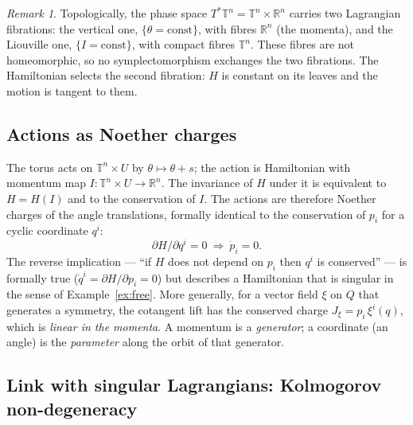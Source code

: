 \documentclass[11pt,a4paper]{article}
\theoremstyle{definition}
\theoremstyle{remark}
\newtheorem{remark}[theorem]{Remark}
\newcommand{\R}{\mathbb{R}}
\newcommand{\Tor}{\mathbb{T}}
\begin{document}
\begin{remark}
Topologically, the phase space $T^*\Tor^n=\Tor^n\times\R^n$ carries two Lagrangian fibrations: the vertical one, $\{\theta=\mathrm{const}\}$, with fibres $\R^n$ (the momenta), and the Liouville one, $\{I=\mathrm{const}\}$, with compact fibres $\Tor^n$. These fibres are not homeomorphic, so no symplectomorphism exchanges the two fibrations. The Hamiltonian selects the second fibration: $H$ is constant on its leaves and the motion is tangent to them.
\end{remark}

\subsection{Actions as Noether charges}

The torus acts on $\Tor^n\times U$ by $\theta\mapsto\theta+s$; the action is Hamiltonian with momentum map $I:\Tor^n\times U\to\R^n$. The invariance of $H$ under it is equivalent to $H=H(I)$ and to the conservation of $I$. The actions are therefore Noether charges of the angle translations, formally identical to the conservation of $p_i$ for a cyclic coordinate $q^i$:
\[
\partial H/\partial q^i=0\ \Longrightarrow\ \dot p_i=0 .
\]
The reverse implication --- ``if $H$ does not depend on $p_i$ then $q^i$ is conserved'' --- is formally true ($\dot q^i=\partial H/\partial p_i=0$) but describes a Hamiltonian that is singular in the sense of Example~\ref{ex:free}. More generally, for a vector field $\xi$ on $Q$ that generates a symmetry, the cotangent lift has the conserved charge $J_\xi=p_i\,\xi^i(q)$, which is \emph{linear in the momenta}. A momentum is a \emph{generator}; a coordinate (an angle) is the \emph{parameter} along the orbit of that generator.

\subsection{Link with singular Lagrangians: Kolmogorov non-degeneracy}\label{sec:kolmogorov}
\end{document}
